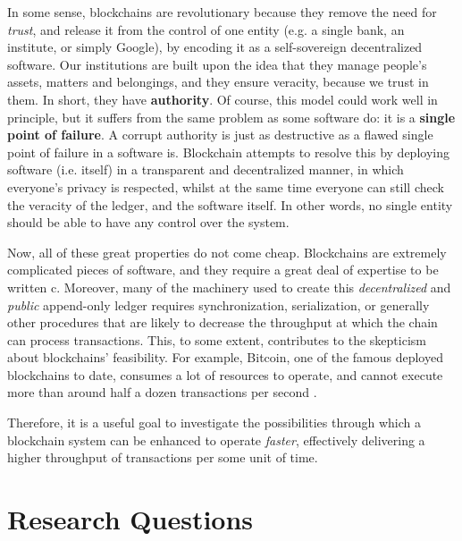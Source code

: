 In some sense, blockchains are revolutionary because they remove the need for \textit{trust}, and
release it from the control of one entity (e.g. a single bank, an institute, or simply Google), by encoding it as a
self-sovereign decentralized software. Our institutions are built upon the idea that they manage
people's assets, matters and belongings, and they ensure veracity, because we trust in them. In
short, they have \textbf{authority}. Of course, this model could work well in principle, but it
suffers from the same problem as some software do: it is a \textbf{single point of failure}. A
corrupt authority is just as destructive as a flawed single point of failure in a software is.
Blockchain attempts to resolve this by deploying software (i.e. itself) in a transparent and
decentralized manner, in which everyone's privacy is respected, whilst at the same time everyone can
still check the veracity of the ledger, and the software itself. In other words, no single entity
should be able to have any control over the system.

Now, all of these great properties do not come cheap. Blockchains are extremely complicated pieces
of software, and they require a great deal of expertise to be written c. Moreover, many of the
machinery used to create this \textit{decentralized} and \textit{public} append-only ledger requires
synchronization, serialization, or generally other procedures that are likely to decrease the
throughput at which the chain can process transactions. This, to some extent, contributes to the
skepticism about blockchains' feasibility. For example, Bitcoin, one of the famous deployed
blockchains to date, consumes a lot of resources to operate, and cannot execute more than around
half a dozen transactions per second \cite{gervaisSecurityPerformanceProof2016}.

Therefore, it is a useful goal to investigate the possibilities through which a blockchain system
can be enhanced to operate \textit{faster}, effectively delivering a higher throughput of
transactions per some unit of time.

\section{Research Questions} \label{chap_intro:sec:resarch_q}

